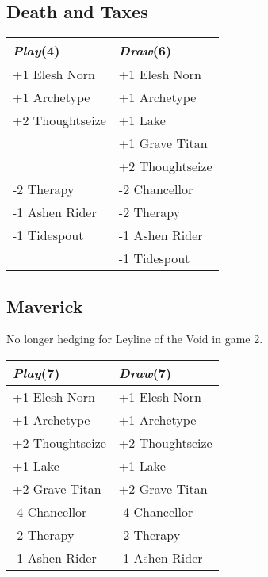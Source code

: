 \documentclass{article}
\renewcommand *\contentsname{Contents}
\begin{document}
\begin{multicols}{2}
\subsection*{Death and Taxes}
\begin{center}
\begin{tabular}{| l | l |}
\hline
\textit{Play}(4) & \textit{Draw}(6) \\
\hline
\cellcolor[HTML]{BBDDBB}\small{+1 Elesh Norn} & \cellcolor[HTML]{BBDDBB}\small{+1 Elesh Norn}\\
\cellcolor[HTML]{BBDDBB}\small{+1 Archetype} & \cellcolor[HTML]{BBDDBB}\small{+1 Archetype}\\
\cellcolor[HTML]{BBDDBB}\small{+2 Thoughtseize} & \cellcolor[HTML]{BBDDBB}\small{+1 Lake}\\
 & \cellcolor[HTML]{BBDDBB}\small{+1 Grave Titan}\\
 & \cellcolor[HTML]{BBDDBB}\small{+2 Thoughtseize}\\
\cellcolor[HTML]{DDBBBB}\small{-2 Therapy} & \cellcolor[HTML]{DDBBBB}\small{-2 Chancellor}\\
\cellcolor[HTML]{DDBBBB}\small{-1 Ashen Rider} & \cellcolor[HTML]{DDBBBB}\small{-2 Therapy}\\
\cellcolor[HTML]{DDBBBB}\small{-1 Tidespout} & \cellcolor[HTML]{DDBBBB}\small{-1 Ashen Rider}\\
 & \cellcolor[HTML]{DDBBBB}\small{-1 Tidespout}\\
\hline
\end{tabular}
\end{center}
\subsection*{Maverick}
No longer hedging for Leyline of the Void in game 2.\begin{center}
\begin{tabular}{| l | l |}
\hline
\textit{Play}(7) & \textit{Draw}(7) \\
\hline
\cellcolor[HTML]{BBDDBB}\small{+1 Elesh Norn} & \cellcolor[HTML]{BBDDBB}\small{+1 Elesh Norn}\\
\cellcolor[HTML]{BBDDBB}\small{+1 Archetype} & \cellcolor[HTML]{BBDDBB}\small{+1 Archetype}\\
\cellcolor[HTML]{BBDDBB}\small{+2 Thoughtseize} & \cellcolor[HTML]{BBDDBB}\small{+2 Thoughtseize}\\
\cellcolor[HTML]{BBDDBB}\small{+1 Lake} & \cellcolor[HTML]{BBDDBB}\small{+1 Lake}\\
\cellcolor[HTML]{BBDDBB}\small{+2 Grave Titan} & \cellcolor[HTML]{BBDDBB}\small{+2 Grave Titan}\\
\cellcolor[HTML]{DDBBBB}\small{-4 Chancellor} & \cellcolor[HTML]{DDBBBB}\small{-4 Chancellor}\\
\cellcolor[HTML]{DDBBBB}\small{-2 Therapy} & \cellcolor[HTML]{DDBBBB}\small{-2 Therapy}\\
\cellcolor[HTML]{DDBBBB}\small{-1 Ashen Rider} & \cellcolor[HTML]{DDBBBB}\small{-1 Ashen Rider}\\
\hline
\end{tabular}
\end{center}

\end{multicols}
\end{document}

